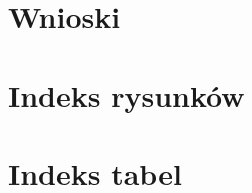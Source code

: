 \documentclass[12pt]{article}
\numberwithin{figure}{section}
\begin{document}
\section{Wnioski}

    \clearpage
    
    \section{Indeks rysunków}
        \listoffigures
    \clearpage    
    
    \section{Indeks tabel}
        \listoftables
    \clearpage
    
\end{document}
